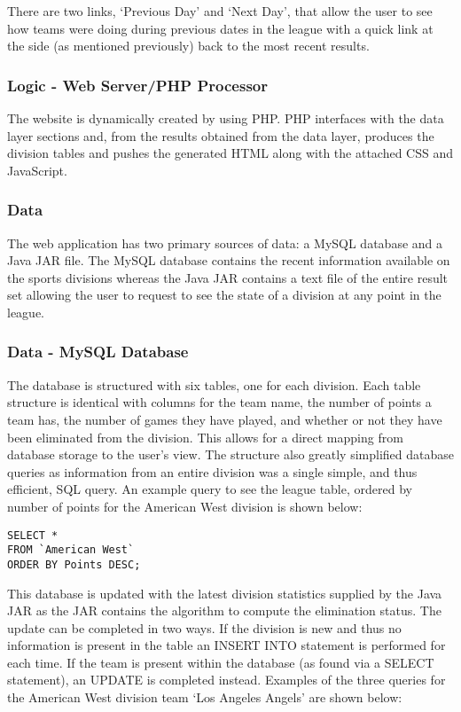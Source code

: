 There are two links, `Previous Day' and `Next Day', that allow the user to
see how teams were doing during previous dates in the league with a quick
link at the side (as mentioned previously) back to the most recent results.

\subsubsection{Logic - Web Server/PHP Processor}

The website is dynamically created by using PHP. PHP interfaces with 
the data layer sections and, from the results obtained from the data layer,
produces the division tables and pushes the generated HTML along with the
attached CSS and JavaScript.

\subsubsection{Data}

The web application has two primary sources of data: a MySQL database and a
Java JAR file. The MySQL database contains the recent information available
on the sports divisions whereas the Java JAR contains a text file of the entire
result set allowing the user to request to see the state of a division at any
point in the league.

\subsubsection{Data - MySQL Database}

The database is structured with six tables, one for each division. Each table
structure is identical with columns for the team name, the number of points
a team has, the number of games they have played, and whether or not they have
been eliminated from the division. This allows for a direct mapping from
database storage to the user's view. The structure also greatly simplified 
database queries as information from an entire division was a single simple, and 
thus efficient, SQL query. An example query to see the league table, ordered by 
number of points for the American West division is shown below:

\begin{verbatim}
SELECT *
FROM `American West`
ORDER BY Points DESC;
\end{verbatim}

This database is updated with the latest division statistics supplied by the 
Java JAR as the JAR contains the algorithm to compute the elimination status.
The update can be completed in two ways. If the division is new and thus no
information is present in the table an INSERT INTO statement is performed for
each time. If the team is present within the database (as found via a SELECT
statement), an UPDATE is completed instead. Examples of the three queries
for the American West division team `Los Angeles Angels' are shown below:

